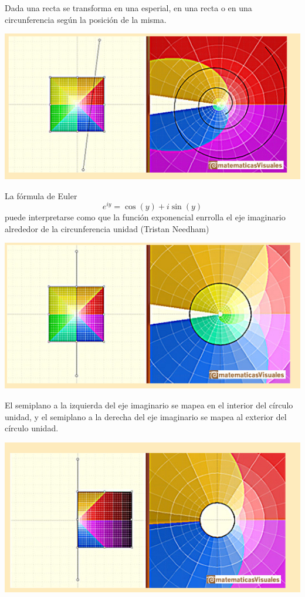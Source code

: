 \documentclass{apuntes}
\begin{document}
Dada una recta se transforma en una esperial, en una recta o en una circunferencia según la posición de la misma.
\begin{center}
\includegraphics[scale=0.75]{img/exp3.png}
\end{center}

La fórmula de Euler
\[e^{iy}=\cos(y)+i\sin(y)\]
puede interpretarse como que la función exponencial enrrolla el eje imaginario alrededor de la circunferencia unidad (Tristan Needham)
\begin{center}
\includegraphics[scale=0.75]{img/exp4.png}
\end{center}

El semiplano a la izquierda del eje imaginario se mapea en el interior del círculo unidad, y el semiplano a la derecha del eje imaginario se mapea al exterior del círculo unidad.
\begin{center}
\includegraphics[scale=0.75]{img/exp5.png}
\end{center}
\end{document}
